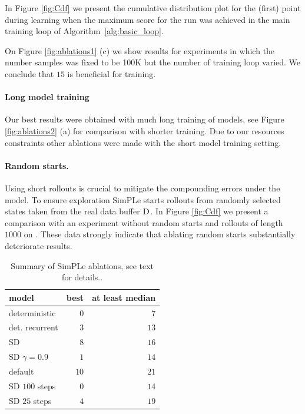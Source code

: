In Figure \ref{fig:Cdf} we present the cumulative distribution plot for the (first) point during learning when the maximum score for the run was achieved in the main training loop of Algorithm~\ref{alg:basic_loop}. 

On Figure \ref{fig:ablations1} (c) we show results for experiments in which the number samples was fixed to be 100K but the number of training loop varied. We conclude that $15$ is beneficial for training.


\paragraph{Long model training} Our best results were obtained with much long training of models, see Figure \ref{fig:ablations2} (a) for comparison with shorter training. Due to our resources constraints other ablations were made with the short model training setting.

\paragraph{Random starts.} Using short rollouts is crucial to mitigate the compounding errors under the model. To ensure exploration SimPLe starts rollouts from randomly selected states taken from the real data buffer $\textsc{D}$. In Figure \ref{fig:Cdf} we present a comparison with an experiment without random starts and rollouts of length $1000$ on \seaquest. These data strongly indicate that ablating random starts substantially deteriorate results.  


\begin{table}
\caption{Summary of SimPLe ablations, see text for details..}
\begin{center}
  \begin{tabular}{lrr}\label{tab:ab}
model  &  best &  at least median \\
\midrule
deterministic       &     $0$ &                $7$ \\
det. recurrent  &     $3$ &               $13$ \\
SD         &     $8$ &               $16$ \\
SD $\gamma=0.9$     &     $1$ &               $14$ \\
default     &     $10$ &               $21$ \\
SD $100$ steps    &     $0$ &               $14$ \\
SD $25$ steps     &     $4$ &               $19$ \\
\bottomrule
\end{tabular} 
\end{center}
\end{table}


